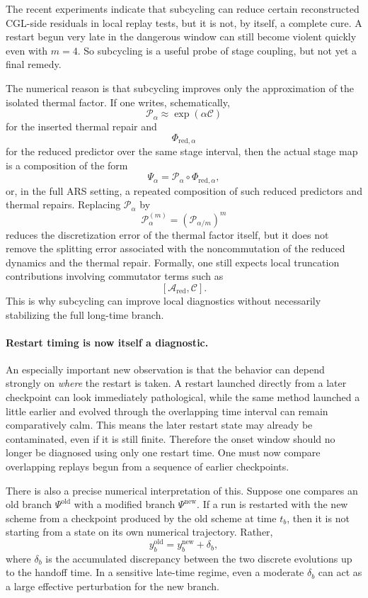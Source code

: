 \documentclass[11pt]{article}
\begin{document}
The recent experiments indicate that subcycling can reduce certain
reconstructed CGL-side residuals in local replay tests, but it is not, by
itself, a complete cure. A restart begun very late in the dangerous window can
still become violent quickly even with $m=4$. So subcycling is a useful probe
of stage coupling, but not yet a final remedy.

The numerical reason is that subcycling improves only the approximation of the
isolated thermal factor. If one writes, schematically,
\[
\mathcal P_\alpha \approx \exp(\alpha \mathcal C)
\]
for the inserted thermal repair and
\[
\Phi_{\mathrm{red},\alpha}
\]
for the reduced predictor over the same stage interval, then the actual stage
map is a composition of the form
\[
\Psi_\alpha = \mathcal P_\alpha \circ \Phi_{\mathrm{red},\alpha},
\]
or, in the full ARS setting, a repeated composition of such reduced predictors
and thermal repairs. Replacing $\mathcal P_\alpha$ by
\[
\mathcal P_\alpha^{(m)} = \left(\mathcal P_{\alpha/m}\right)^m
\]
reduces the discretization error of the thermal factor itself, but it does not
remove the splitting error associated with the noncommutation of the reduced
dynamics and the thermal repair. Formally, one still expects local truncation
contributions involving commutator terms such as
\[
[\mathcal A_{\mathrm{red}},\mathcal C].
\]
This is why subcycling can improve local diagnostics without necessarily
stabilizing the full long-time branch.

\paragraph{Restart timing is now itself a diagnostic.}
An especially important new observation is that the behavior can depend
strongly on \emph{where} the restart is taken. A restart launched directly from
a later checkpoint can look immediately pathological, while the same method
launched a little earlier and evolved through the overlapping time interval can
remain comparatively calm. This means the later restart state may already be
contaminated, even if it is still finite. Therefore the onset window should no
longer be diagnosed using only one restart time. One must now compare
overlapping replays begun from a sequence of earlier checkpoints.

There is also a precise numerical interpretation of this. Suppose one compares
an old branch $\Psi^{\mathrm{old}}$ with a modified branch
$\Psi^{\mathrm{new}}$. If a run is restarted with the new scheme from a
checkpoint produced by the old scheme at time $t_b$, then it is not starting
from a state on its own numerical trajectory. Rather,
\[
y_b^{\mathrm{old}}
=
y_b^{\mathrm{new}} + \delta_b,
\]
where $\delta_b$ is the accumulated discrepancy between the two discrete
evolutions up to the handoff time. In a sensitive late-time regime, even a
moderate $\delta_b$ can act as a large effective perturbation for the new
branch.
\end{document}
